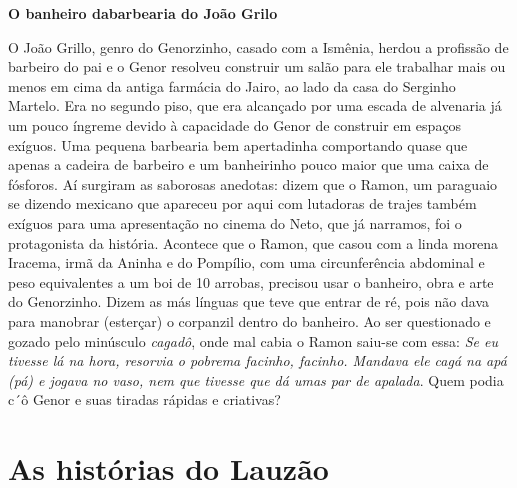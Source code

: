 \documentclass[12pt,brazil,]{book}
\begin{document}
\textbf{O banheiro dabarbearia do João Grilo}

O João Grillo, genro do Genorzinho, casado com a Ismênia, herdou a
profissão de barbeiro do pai e o Genor resolveu construir um salão para
ele trabalhar mais ou menos em cima da antiga farmácia do Jairo, ao lado
da casa do Serginho Martelo. Era no segundo piso, que era alcançado por
uma escada de alvenaria já um pouco íngreme devido à capacidade do Genor
de construir em espaços exíguos. Uma pequena barbearia bem apertadinha
comportando quase que apenas a cadeira de barbeiro e um banheirinho
pouco maior que uma caixa de fósforos. Aí surgiram as saborosas
anedotas: dizem que o Ramon, um paraguaio se dizendo mexicano que
apareceu por aqui com lutadoras de trajes também exíguos para uma
apresentação no cinema do Neto, que já narramos, foi o protagonista da
história. Acontece que o Ramon, que casou com a linda morena Iracema,
irmã da Aninha e do Pompílio, com uma circunferência abdominal e peso
equivalentes a um boi de 10 arrobas, precisou usar o banheiro, obra e
arte do Genorzinho. Dizem as más línguas que teve que entrar de ré, pois
não dava para manobrar (esterçar) o corpanzil dentro do banheiro. Ao ser
questionado e gozado pelo minúsculo \emph{cagadô}, onde mal cabia o
Ramon saiu-se com essa: \emph{Se eu tivesse lá na hora, resorvia o
pobrema facinho, facinho. Mandava ele cagá na apá (pá) e jogava no vaso,
nem que tivesse que dá umas par de apalada}. Quem podia c´ô Genor e suas
tiradas rápidas e criativas?

\section{As histórias do Lauzão}\label{as-histuxf3rias-do-lauzuxe3o}
\end{document}
